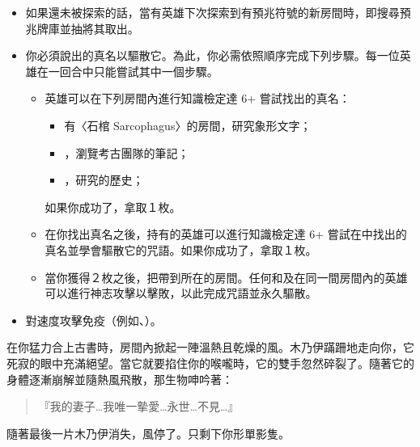 \vspace*{-1em}
\begin{itemize}
  \item 如果還未被探索的話，當有英雄下次探索到有預兆符號的新房間時，即搜尋預兆牌庫並抽將其取出。
  \item 你必須說出的真名以驅散它。為此，你必需依照順序完成下列步驟。每一位英雄在一回合中只能嘗試其中一個步驟。
    \begin{itemize}
      \item 英雄可以在下列房間內進行知識檢定達 6+ 嘗試找出的真名：
        \begin{itemize}
          \item 有〈石棺 Sarcophagus〉的房間，研究象形文字；
          \item {}，瀏覽考古團隊的筆記；
          \item {}，研究的歷史；
        \end{itemize}
        如果你成功了，拿取１枚。
      \item 在你找出真名之後，持有的英雄可以進行知識檢定達 6+ 嘗試在中找出的真名並學會驅散它的咒語。如果你成功了，拿取１枚。
      \item 當你獲得２枚之後，把帶到所在的房間。任何和及在同一間房間內的英雄可以進行神志攻擊以擊敗，以此完成咒語並永久驅散。
    \end{itemize}
  \item {}對速度攻擊免疫（例如、）。
\end{itemize}

\begin{HauntStory}
  在你猛力合上古書時，房間內掀起一陣溫熱且乾燥的風。木乃伊蹣跚地走向你，它死寂的眼中充滿絕望。當它就要掐住你的喉嚨時，它的雙手忽然碎裂了。隨著它的身體逐漸崩解並隨熱風飛散，那生物呻吟著：
  \begin{quote}
    『我的妻子…我唯一摰愛…永世…不見…』
  \end{quote}
  隨著最後一片木乃伊消失，風停了。只剩下你形單影隻。
\end{HauntStory}

